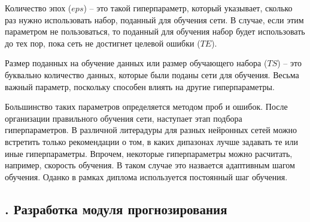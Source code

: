 {  \par \redline Количество эпох ($eps$) {--} это такой гиперпараметр, который указывает, сколько раз нужно использовать набор, поданный для обучения сети. В случае, если этим параметром не пользоваться, то поданный для обучения набор будет использовать до тех пор, пока сеть не достигнет целевой ошибки ($TE$).

  \par \redline Размер поданных на обучение данных или размер обучающего набора ($TS$) {--} это буквально количество данных, которые были поданы сети для обучения. Весьма важный параметр, поскольку способен влиять на другие гиперпараметры. 

  \par \redline Большинство таких параметров определяется методом проб и ошибок. После организации правильного обучения сети, наступает этап подбора гиперпараметров. В различной литерадуры для разных нейронных сетей можно встретить только рекомендации о том, в каких дипазонах лучше задавать те или иные гиперпараметры. Впрочем, некоторые гиперпараметры можно расчитать, например, скорость обучения. В таком случае это назвается адаптивным шагом обучения. Оданко в рамках диплома используется постоянный шаг обучения. 

  \par 
}

\subtitlespace

\subsection*{ 
  \gostTitleFont
  \redline
  \thechaptercntr .\thesubchaptercntr \spc 
  Разработка модуля прогнозирования
} \addtocounter{subchaptercntr}{1} 
  
\subtitlespace
  
